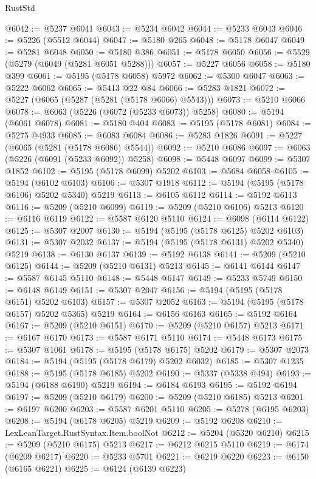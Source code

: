 \begin{lexlean}{RustStd}
\begin{coremodule}
@6042 := @5237 @6041
@6043 := @5234 @6042
@6044 := @5233 @6043
@6046 := @5226 (@5512 @6044)
@6047 := @5180 @265
@6048 := @5178 @6047
@6049 := @5281 @6048
@6050 := @5180 @386
@6051 := @5178 @6050
@6056 := @5529 (@5279 (@6049 (@5281 @6051 @5288)))
@6057 := @5227 @6056
@6058 := @5180 @399
@6061 := @5195 (@5178 @6058) @5972
@6062 := @5300 @6047
@6063 := @5222 @6062
@6065 := @5413 @22 @84
@6066 := @5283 @1821
@6072 := @5227 (@6065 (@5287 (@5281 (@5178 @6066) @5543)))
@6073 := @5210 @6066
@6078 := @6063 (@5226 (@6072 (@5233 @6073)) @5258)
@6080 := @5194 (@6061 @6078)
@6081 := @5180 @404
@6083 := @5195 (@5178 @6081)
@6084 := @5275 @4933
@6085 := @6083 @6084
@6086 := @5283 @1826
@6091 := @5227 (@6065 (@5281 (@5178 @6086) @5544))
@6092 := @5210 @6086
@6097 := @6063 (@5226 (@6091 (@5233 @6092)) @5258)
@6098 := @5448 @6097
@6099 := @5307 @1852
@6102 := @5195 (@5178 @6099) @5202
@6103 := @5684 @6058
@6105 := @5194 (@6102 @6103)
@6106 := @5307 @1918
@6112 := @5194 (@5195 (@5178 @6106) @5202 @5340) @5219
@6113 := @6105 @6112
@6114 := @5192 @6113
@6116 := @5209 (@5210 @6099)
@6119 := @5209 (@5210 @6106) @5213
@6120 := @6116 @6119
@6122 := @5587 @6120 @5110
@6124 := @6098 (@6114 @6122)
@6125 := @5307 @2007
@6130 := @5194 (@5195 (@5178 @6125) @5202 @6103)
@6131 := @5307 @2032
@6137 := @5194 (@5195 (@5178 @6131) @5202 @5340) @5219
@6138 := @6130 @6137
@6139 := @5192 @6138
@6141 := @5209 (@5210 @6125)
@6144 := @5209 (@5210 @6131) @5213
@6145 := @6141 @6144
@6147 := @5587 @6145 @5110
@6148 := @5448 @6147
@6149 := @5233 @5749
@6150 := @6148 @6149
@6151 := @5307 @2047
@6156 := @5194 (@5195 (@5178 @6151) @5202 @6103)
@6157 := @5307 @2052
@6163 := @5194 (@5195 (@5178 @6157) @5202 @5365) @5219
@6164 := @6156 @6163
@6165 := @5192 @6164
@6167 := @5209 (@5210 @6151)
@6170 := @5209 (@5210 @6157) @5213
@6171 := @6167 @6170
@6173 := @5587 @6171 @5110
@6174 := @5448 @6173
@6175 := @5307 @1061
@6178 := @5195 (@5178 @6175) @5202
@6179 := @5307 @2073
@6184 := @5194 (@5195 (@5178 @6179) @5202 @6032)
@6185 := @5307 @1235
@6188 := @5195 (@5178 @6185) @5202
@6190 := @5337 (@5338 @494)
@6193 := @5194 (@6188 @6190) @5219
@6194 := @6184 @6193
@6195 := @5192 @6194
@6197 := @5209 (@5210 @6179)
@6200 := @5209 (@5210 @6185) @5213
@6201 := @6197 @6200
@6203 := @5587 @6201 @5110
@6205 := @5278 (@6195 @6203)
@6208 := @5194 (@6178 @6205) @5219
@6209 := @5192 @6208
@6210 := LexLeanTarget.RustSyntax.Item.boolNot
@6212 := @5204 (@5320 @6210)
@6215 := @5209 (@5210 @6175) @5213
@6217 := @6212 @6215 @5110
@6219 := @6174 (@6209 @6217)
@6220 := @5233 @5701
@6221 := @6219 @6220
@6223 := @6150 (@6165 @6221)
@6225 := @6124 (@6139 @6223)

\end{coremodule}
\end{lexlean}
